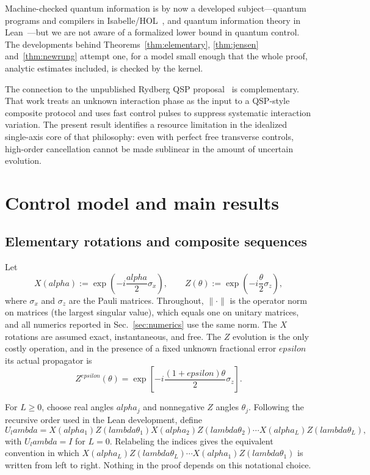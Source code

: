 \documentclass[%
  aps,
  pra,
  preprint,
  superscriptaddress,
  amsmath,amssymb,
  nofootinbib,
  floatfix,
]{revtex4-2}
\def\lambda{lambda}\def\tau{tau}\def\phi{phi}\def\alpha{alpha}%
\def\eps{epsilon}\def\C{C}\def\R{R}\def\lean#1{#1}\def\mathrm#1{#1}%
\theoremstyle{definition}
\theoremstyle{remark}
\newcommand{\C}{\mathbb C}
\newcommand{\R}{\mathbb R}
\newcommand{\eps}{\varepsilon}
\DeclareRobustCommand{\lean}[1]{\path{#1}}
\begin{document}
Machine-checked quantum information is by now a developed subject---quantum programs and
compilers in Isabelle/HOL~\cite{Bordg2021}, and quantum information theory in
Lean~\cite{Meiburg2025}---but we are not aware of a formalized lower bound in quantum control.
The developments behind Theorems~\ref{thm:elementary}, \ref{thm:jensen}
and~\ref{thm:newrung} attempt one, for a model small enough that the whole proof, analytic
estimates included, is checked by the kernel.

The connection to the unpublished Rydberg QSP proposal~\cite{Ye2026} is complementary. That work treats an unknown interaction phase as the input to a
QSP-style composite protocol and uses fast control pulses to suppress systematic interaction
variation. The present result identifies a resource limitation in the idealized single-axis
core of that philosophy: even with perfect free transverse controls, high-order cancellation
cannot be made sublinear in the amount of uncertain evolution.

\section{Control model and main results}
\label{sec:model}

\subsection{Elementary rotations and composite sequences}

Let
\begin{equation}
X(\alpha):=\exp\!\left(-\mathrm{i}\frac{\alpha}{2}\sigma_x\right),
\qquad
Z(\theta):=\exp\!\left(-\mathrm{i}\frac{\theta}{2}\sigma_z\right),
\label{eq:rotations}
\end{equation}
where $\sigma_x$ and $\sigma_z$ are the Pauli matrices. Throughout, $\lVert\cdot\rVert$ is the
operator norm on matrices (the largest singular value), which equals one on unitary matrices, and
all numerics reported in Sec.~\ref{sec:numerics} use the same norm. The $X$ rotations are assumed exact,
instantaneous, and free. The $Z$ evolution is the only costly operation, and in the presence of a
fixed unknown fractional error $\eps$ its actual propagator is
\begin{equation}
Z^{\eps}(\theta)
=\exp\!\left[-\mathrm{i}\frac{(1+\eps)\theta}{2}\sigma_z\right].
\label{eq:imperfectZ}
\end{equation}

For $L\ge0$, choose real angles $\alpha_j$ and nonnegative $Z$ angles $\theta_j$. Following the
recursive order used in the Lean development, define
\begin{equation}
U_\lambda
= X(\alpha_1)Z(\lambda\theta_1)
  X(\alpha_2)Z(\lambda\theta_2)\cdots
  X(\alpha_L)Z(\lambda\theta_L),
\label{eq:sequence}
\end{equation}
with $U_\lambda=I$ for $L=0$. Relabeling the indices gives the equivalent convention in which
$X(\alpha_L)Z(\lambda\theta_L)\cdots X(\alpha_1)Z(\lambda\theta_1)$ is written from left to right.
Nothing in the proof depends on this notational choice.
\end{document}
